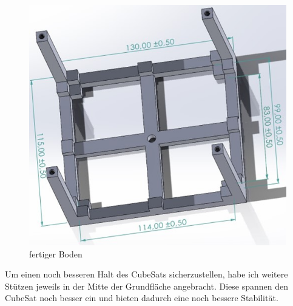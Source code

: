  \begin{figure}
     \centering
     \includegraphics[scale=0.5]{image/fertiger boden.jpg}
     \caption{fertiger Boden}
     \label{fig:enter-label}
 \end{figure}

Um einen noch besseren Halt des CubeSats sicherzustellen, habe ich weitere Stützen jeweils in der Mitte der Grundfläche angebracht. Diese spannen den CubeSat noch besser ein und bieten dadurch eine noch bessere Stabilität.\\


